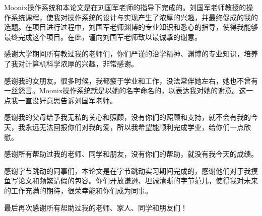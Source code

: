 \begin{acknowledgements}

Moonix操作系统和本论文是在刘国军老师的指导下完成的。刘国军老师教授的操作系统课程，使我对操作系统的设计与实现产生了浓厚的兴趣，并最终促成的我的选题。在项目进行过程中，刘国军老师渊博的专业知识和悉心的指导，使得我能够最终完成这个项目。在此，谨向刘国军老师致以最诚挚的谢意。

感谢大学期间所有教过我的老师们，你们严谨的治学精神、渊博的专业知识，培养了我对计算机科学浓厚的兴趣，非常感谢。

感谢我的女朋友。很多时候，我都疲于学业和工作，没法常伴她左右，她也不曾有一丝怨言。Moonix操作系统就是以她的名字命名的，以表达我对她的谢意。这一点我一直没好意思告诉刘国军老师。

感谢我的父母给予我无私的关心和照顾，没有你们的照顾和支持，就不会有我的今天，我永远无法回报你们对我的爱，所以我希望能顺利完成学业，给你们一点欣慰。

感谢所有帮助过我的老师、同学和朋友，没有你们的帮助，就没有我今天的成绩。

感谢字节跳动的同事们，本论文是在字节跳动实习期间完成的，感谢他们对于我摸鱼写论文和频繁请假的包容。你们开放谦逊、坦诚清晰的字节范儿，使得我对未来的工作充满的期待，很荣幸能和你们成为同事。

最后再次感谢所有帮助过我的老师、家人、同学和朋友们！

\end{acknowledgements}
